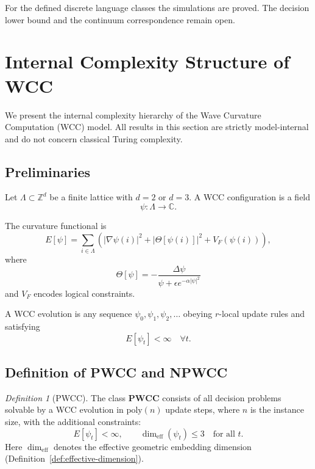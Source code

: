 \documentclass[12pt]{article}
\theoremstyle{remark}
\newtheorem{definition}[theorem]{Definition}
\begin{document}
For the defined discrete language classes the simulations are proved. The decision lower bound and the continuum correspondence remain open.






\clearpage

\section{Internal Complexity Structure of WCC}

We present the internal complexity hierarchy of the Wave Curvature
Computation (WCC) model.  All results in this section are strictly
model-internal and do not concern classical Turing complexity.

\subsection{Preliminaries}

Let $\Lambda \subset \mathbb{Z}^d$ be a finite lattice with $d=2$ or
$d=3$.  A WCC configuration is a field
\[
  \psi : \Lambda \to \mathbb{C}.
\]

The curvature functional is
\begin{equation}
E[\psi]
=
\sum_{i\in\Lambda}
\left(
  |\nabla\psi(i)|^2
  +
  |\Theta[\psi(i)]|^2
  +
  V_F(\psi(i))
\right),
\end{equation}
where
\[
\Theta[\psi]
=
-\frac{\Delta\psi}{\psi + \epsilon e^{-\alpha|\psi|^2}}
\]
and $V_F$ encodes logical constraints.

A WCC evolution is any sequence $\psi_0,\psi_1,\psi_2,\dots$ obeying
$r$-local update rules and satisfying
\[
E[\psi_t] < \infty \quad \forall t.
\]

\subsection{Definition of PWCC and NPWCC}

\begin{definition}[PWCC]
The class $\mathbf{PWCC}$ consists of all decision problems solvable by
a WCC evolution in $\mathrm{poly}(n)$ update steps, where $n$ is the
instance size, with the additional constraints:
\[
E[\psi_t] < \infty, \qquad
\dim_{\mathrm{eff}}(\psi_t) \le 3
\quad\text{for all } t.
\]
Here $\dim_{\mathrm{eff}}$ denotes the effective geometric embedding
dimension (Definition~\ref{def:effective-dimension}).
\end{definition}
\end{document}

